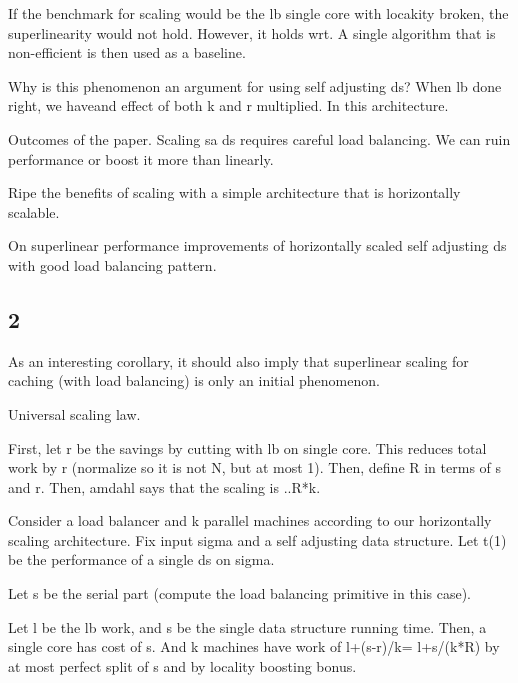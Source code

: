 If the benchmark for scaling would be the lb single core with locakity broken, the superlinearity would not hold. However, it holds wrt. A single algorithm that is non-efficient is then used as a baseline.




Why is this phenomenon an argument for using self adjusting ds? When lb done right, we haveand effect of both k and r multiplied. In this architecture.

Outcomes of the paper. Scaling sa ds requires careful load balancing. We can ruin performance or boost it more than linearly.

Ripe the benefits of scaling with a simple architecture that is horizontally scalable.



On superlinear performance improvements of horizontally scaled self adjusting ds with good load balancing pattern.


\subsection{2}





As an interesting corollary, it should also imply that superlinear scaling for caching (with load balancing) is only an initial phenomenon.







Universal scaling law.

First, let r be the savings by cutting with lb on single core. This reduces total work by r (normalize so it is not N, but at most 1). Then, define R in terms of s and r. Then, amdahl says that the scaling is ..R*k.


Consider a load balancer and k parallel machines according to our horizontally scaling architecture. Fix input sigma and a self adjusting data structure. Let t(1) be the performance of a single ds on sigma.




Let s be the serial part (compute the load balancing primitive in this case).




Let l be the lb work, and s be the single data structure running time. Then, a single core has cost of s. And k machines have work of l+(s-r)/k= l+s/(k*R) by at most perfect split of s and by locality boosting bonus.


